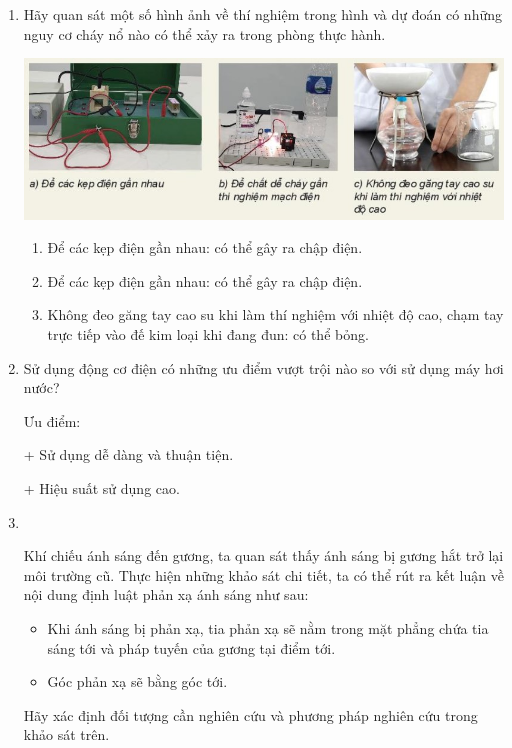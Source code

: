 \begin{enumerate}[label=\bfseries Câu \arabic*:]
	\item {}


{
	Hãy quan sát một số hình ảnh về thí nghiệm trong hình và dự đoán có những nguy cơ cháy nổ nào có thể xảy ra trong phòng thực hành.
	\begin{center}
		\includegraphics[scale=0.6]{../figs/VN10-2022-PH-TP003-7.jpg}
	\end{center}
}

\hideall
{	
	\begin{enumerate}[label=\alph*)]
		\item Để các kẹp điện gần nhau: có thể gây ra chập điện.
		\item Để các kẹp điện gần nhau: có thể gây ra chập điện.
		\item Không đeo găng tay cao su khi làm thí nghiệm với nhiệt độ cao, chạm tay trực tiếp vào đế kim loại khi đang đun: có thể bỏng.
	\end{enumerate}
}

	\item {}
	
	
	{
		Sử dụng động cơ điện có những ưu điểm vượt trội nào so với sử dụng máy hơi nước?
	}
	
	\hideall
	{	
		Ưu điểm:
		
		+ Sử dụng dễ dàng và thuận tiện.
		
		+ Hiệu suất sử dụng cao.
	}
	
	\item {}\\
	{Khí chiếu ánh sáng đến gương, ta quan sát thấy ánh sáng bị gương hắt trở lại môi trường cũ. Thực hiện những khảo sát chi tiết, ta có thể rút ra kết luận về nội dung định luật phản xạ ánh sáng như sau:
		\begin{itemize}
			\item Khi ánh sáng bị phản xạ, tia phản xạ sẽ nằm trong mặt phẳng chứa tia sáng tới và pháp tuyến của gương tại điểm tới.
			\item Góc phản xạ sẽ bằng góc tới.
		\end{itemize}
	Hãy xác định đối tượng cần nghiên cứu và phương pháp nghiên cứu trong khảo sát trên.
}
	

\end{enumerate}
